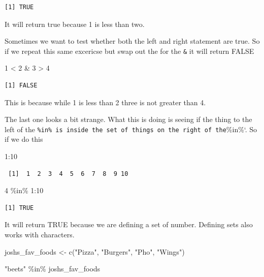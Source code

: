 \documentclass[
  letterpaper,
  DIV=11,
  numbers=noendperiod,
  oneside]{scrreprt}
\newenvironment{Shaded}{\begin{snugshade}}{\end{snugshade}}
\newcommand{\DecValTok}[1]{\textcolor[rgb]{0.68,0.00,0.00}{#1}}
\newcommand{\FunctionTok}[1]{\textcolor[rgb]{0.28,0.35,0.67}{#1}}
\newcommand{\NormalTok}[1]{\textcolor[rgb]{0.00,0.23,0.31}{#1}}
\newcommand{\OtherTok}[1]{\textcolor[rgb]{0.00,0.23,0.31}{#1}}
\newcommand{\SpecialCharTok}[1]{\textcolor[rgb]{0.37,0.37,0.37}{#1}}
\newcommand{\StringTok}[1]{\textcolor[rgb]{0.13,0.47,0.30}{#1}}
\begin{document}
\begin{verbatim}
[1] TRUE
\end{verbatim}

It will return true because 1 is less than two.

Sometimes we want to test whether both the left and right statement are
true. So if we repeat this same excericse but swap out the
\texttt{\textbar{}} for the \texttt{\&} it will return FALSE

\begin{Shaded}
\begin{Highlighting}[]
\DecValTok{1} \SpecialCharTok{\textless{}} \DecValTok{2} \SpecialCharTok{\&} \DecValTok{3} \SpecialCharTok{\textgreater{}} \DecValTok{4}
\end{Highlighting}
\end{Shaded}

\begin{verbatim}
[1] FALSE
\end{verbatim}

This is because while 1 is less than 2 three is not greater than 4.

The last one looks a bit strange. What this is doing is seeing if the
thing to the left of the
\texttt{\%in\%\ is\ inside\ the\ set\ of\ things\ on\ the\ right\ of\ the}\%in\%`.
So if we do this

\begin{Shaded}
\begin{Highlighting}[]
\DecValTok{1}\SpecialCharTok{:}\DecValTok{10}
\end{Highlighting}
\end{Shaded}

\begin{verbatim}
 [1]  1  2  3  4  5  6  7  8  9 10
\end{verbatim}

\begin{Shaded}
\begin{Highlighting}[]
\DecValTok{4} \SpecialCharTok{\%in\%} \DecValTok{1}\SpecialCharTok{:}\DecValTok{10}
\end{Highlighting}
\end{Shaded}

\begin{verbatim}
[1] TRUE
\end{verbatim}

It will return TRUE because we are defining a set of number. Defining
sets also works with characters.

\begin{Shaded}
\begin{Highlighting}[]
\NormalTok{joshs\_fav\_foods }\OtherTok{\textless{}{-}} \FunctionTok{c}\NormalTok{(}\StringTok{"Pizza"}\NormalTok{, }\StringTok{"Burgers"}\NormalTok{, }\StringTok{"Pho"}\NormalTok{, }\StringTok{"Wings"}\NormalTok{)}

\StringTok{"beets"} \SpecialCharTok{\%in\%}\NormalTok{ joshs\_fav\_foods}
\end{Highlighting}
\end{Shaded}
\end{document}
